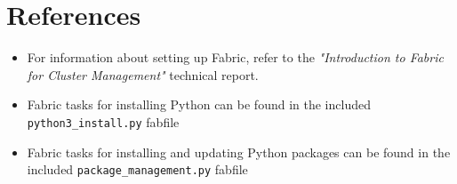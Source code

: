 \documentclass[9pt,twocolumn,twoside]{idsi}
\begin{document}
\section*{References}
\begin{itemize}
  \item For information about setting up Fabric, refer to the \emph{"Introduction to Fabric for Cluster Management"} technical report.
  \item Fabric tasks for installing Python can be found in the included \texttt{python3\_install.py} fabfile
  \item Fabric tasks for installing and updating Python packages can be found in the included \texttt{package\_management.py} fabfile
\end{itemize}
\end{document}
